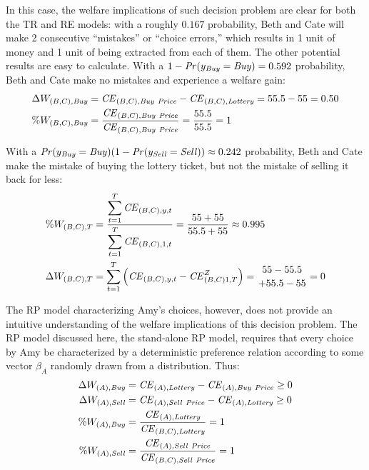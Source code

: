 \documentclass[../main.tex]{subfiles}
\begin{document}
In this case, the welfare implications of such decision problem are clear for both the TR and RE  models: with a roughly $0.167$ probability, Beth and Cate will make 2 consecutive \enquote{mistakes} or \enquote{choice errors,} which results in 1 unit of money and 1 unit of {\CE} being extracted from each of them.
The other potential results are easy to calculate.
With a ${1- {\mathit{Pr}}(y_{\mathit{Buy}}} = \mathit{Buy}) = 0.592$ probability, Beth and Cate make no mistakes and experience a welfare gain:
\begin{align}
	\begin{split}
		\Delta W_{(B,C),\mathit{Buy}} &= {\mathit{CE}}_{(B,C),\mathit{Buy\ Price}} - {\mathit{CE}}_{(B,C),\mathit{Lottery}} = 55.5 - 55 = 0.50\\
		\% W_{(B,C),\mathit{Buy}} &= \frac{{\mathit{CE}}_{(B,C),\mathit{Buy\ Price}}}{{\mathit{CE}}_{(B,C),\mathit{Buy\ Price}}} = \frac{55.5}{55.5} = 1
	\end{split}
\end{align}

With a $ {\mathit{Pr}}(y_{\mathit{Buy}} = \mathit{Buy})(1 - {\mathit{Pr}}(y_{\mathit{Sell}}= \mathit{Sell})) \approx 0.242$ probability, Beth and Cate make the mistake of buying the lottery ticket, but not the mistake of selling it back for less:
\begin{align}
	\begin{split}
		\%W_{(B,C),T} &= \frac{\displaystyle\sum_{t=1}^{T} {\CE}_{(B,C),y,t} }{\displaystyle\sum_{t=1}^{T} {\CE}_{(B,C),1,t}} = \frac{55 + 55}{55.5 + 55} \approx 0.995 \\
		\Delta W_{(B,C),T} &= \sum_{t=1}^T \left( {\CE}_{(B,C),y,t} - {\CE}_{(B,C)1,T}^Z \right)= \genfrac{}{}{0pt}{}{55 - 55.5}{+ 55.5 - 55} = 0
	\end{split}
\end{align}

The RP model characterizing Amy's choices, however, does not provide an intuitive understanding of the welfare implications of this decision problem.
The RP model discussed here, the stand-alone RP model, requires that every choice by Amy be characterized by a deterministic preference relation according to some vector $\beta_A$ randomly drawn from a distribution.
Thus:
\begin{align}
	\label{eq2:RP.welfare}
	\begin{split}
		\Delta W_{(A),\mathit{Buy}} &= {\mathit{CE}}_{(A),\mathit{Lottery}} - {\mathit{CE}}_{(A),\mathit{Buy\ Price}} \geq 0\\
		\Delta W_{(A),\mathit{Sell}} &= {\mathit{CE}}_{(A),\mathit{Sell\ Price}} - {\mathit{CE}}_{(A),\mathit{Lottery}} \geq 0\\
		\% W_{(A),\mathit{Buy}} &= \frac{{\mathit{CE}}_{(A),\mathit{Lottery}}}{{\mathit{CE}}_{(B,C),\mathit{Lottery}}} = 1\\
		\% W_{(A),\mathit{Sell}} &= \frac{{\mathit{CE}}_{(A),\mathit{Sell\ Price}}}{{\mathit{CE}}_{(B,C),\mathit{Sell\ Price}}} = 1
	\end{split}
\end{align}
\end{document}
